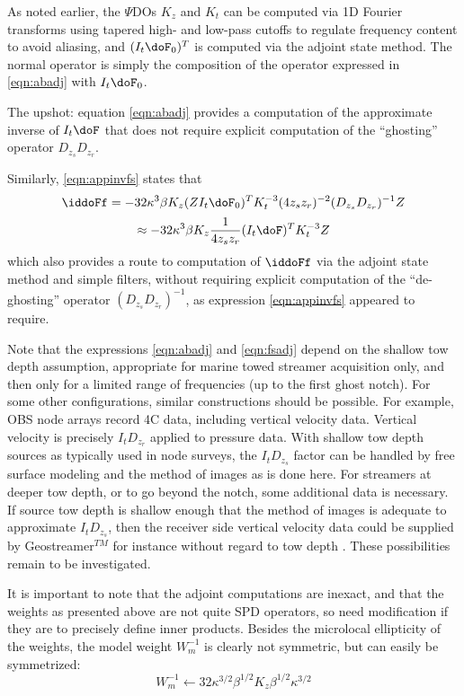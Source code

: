 As noted earlier, the $\Psi$DOs $K_z$ and $K_t$ can be computed via 1D
Fourier transforms using tapered high- and low-pass cutoffs to
regulate frequency content to avoid aliasing, and $(I_t\doF_0)^T $ is
computed via the adjoint state method.  The normal operator is simply
the composition of the operator expressed in \ref{eqn:abadj} with
$I_t\doF_0$.

The upshot: equation \ref{eqn:abadj} provides a computation of the
approximate inverse of $I_t \doF$ that does not require explicit
computation of the ``ghosting'' operator $D_{z_s}D_{z_r}$.

Similarly, \ref{eqn:appinvfs} states that
\[
\iddoFf = -32 \kappa^3 \beta K_z (ZI_t \doF_0)^T K_t^{-3}
(4z_sz_r)^{-2} (D_{z_s}D_{z_r})^{-1}Z
\]
 \begin{eqnarray}
\label{eqn:fsadj}
\approx -32 \kappa^3 \beta K_z \frac{1}{4z_sz_r}(I_t\doF)^T K_t^{-3} Z
\end{eqnarray}
which also provides a route to computation of $\iddoFf$ via the adjoint
state method and simple filters, without requiring explicit
computation of the ``de-ghosting'' operator $(D_{z_s}D_{z_r})^{-1}$,
as expression \ref{eqn:appinvfs} appeared to require.

Note that the expressions \ref{eqn:abadj} and \ref{eqn:fsadj} depend
on the shallow tow depth assumption,  appropriate for marine towed
streamer acquisition only, and then only for a limited range of
frequencies (up to the first ghost notch).
For some other configurations, similar constructions should be
possible. For example, OBS node arrays record 4C data, including
vertical velocity data. Vertical velocity is precisely $I_tD_{z_r}$
applied to pressure data. With shallow tow depth sources as typically
used in node surveys, the $I_tD_{z_s}$ factor can be handled by free
surface modeling and the method of images as is done here. For
streamers at deeper tow depth, or to go beyond the notch, some
additional data is necessary. If source tow depth is shallow enough
that the method of images is adequate to approximate $I_t D_{z_s}$,
then the receiver side vertical velocity data could be supplied by
Geostreamer$^{TM}$ for instance without regard to tow depth . These
possibilities remain to be investigated.

It is important to note that the adjoint computations are
inexact, and that the weights as presented above are not quite SPD
operators, so need modification if they are to precisely define inner
products. Besides the microlocal ellipticity of the weights, the model
weight $W_m^{-1}$ is clearly not symmetric, but can easily be 
symmetrized:
\[
W_m^{-1} \leftarrow 32\kappa^{3/2}\beta^{1/2} K_z \beta^{1/2}\kappa^{3/2}
\]

